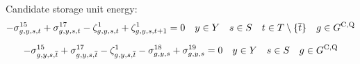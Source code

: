 \documentclass{article}
\begin{document}


Candidate storage unit energy:
\begin{equation}
- \dNonNegativeStorageEnergy + \dMaxStorageEnergyCandidate - \dStorageEnergyTransition + \dStorageEnergyTransition[\iGenerator,\iYear,\iScenario,\iInterval+1] = 0 \quad \iYear \in \sYears \quad \iScenario \in \sScenarios \quad \iInterval \in \sIntervals \setminus \{\iIntervalTerminal\} \quad \iGenerator \in \sStorageCandidate
\end{equation}

\begin{equation}
- \dNonNegativeStorageEnergy[\iGenerator,\iYear,\iScenario,\iIntervalTerminal] + \dMaxStorageEnergyCandidate[\iGenerator,\iYear,\iScenario,\iIntervalTerminal] - \dStorageEnergyTransition[\iGenerator,\iYear,\iScenario,\iIntervalTerminal] - \dMinStorageEnergyIntervalEnd + \dMaxStorageEnergyIntervalEnd = 0 \quad \iYear \in \sYears \quad \iScenario \in \sScenarios \quad \iGenerator \in \sStorageCandidate
\end{equation}

\end{document}
